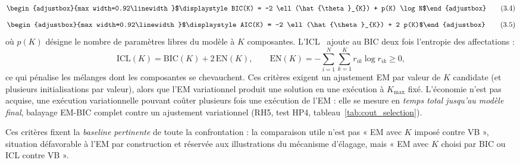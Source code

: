 \begin{equation}
\begin{adjustbox}{max width=0.92\linewidth}$\displaystyle BIC(K) = -2 \ell (\hat{\theta }_{K}) + p(K) \log N$\end{adjustbox}
\tag{3.4}
\label{eq:2_4}
\end{equation}
\begin{equation}
\begin{adjustbox}{max width=0.92\linewidth}$\displaystyle AIC(K) = -2 \ell (\hat{\theta }_{K}) + 2 p(K)$\end{adjustbox}
\tag{3.5}
\label{eq:2_5}
\end{equation}
où $p(K)$ désigne le nombre de paramètres libres du modèle à $K$ composantes. L'ICL~\cite{biernacki2000} ajoute au BIC deux fois l'entropie des affectations :
\begin{equation}
\mathrm{ICL}(K) = \mathrm{BIC}(K) + 2\,\mathrm{EN}(K), \qquad \mathrm{EN}(K) = -\sum_{i=1}^{N}\sum_{k=1}^{K} r_{ik}\log r_{ik} \geq 0,
\tag{3.5b}
\label{eq:2_5b}
\end{equation}
ce qui pénalise les mélanges dont les composantes se chevauchent. Ces critères exigent un ajustement EM par valeur de $K$ candidate (et plusieurs initialisations par valeur), alors que l'EM variationnel produit une solution en une exécution à $K_{\max}$ fixé. L'économie n'est pas acquise, une exécution variationnelle pouvant coûter plusieurs fois une exécution de l'EM : elle se mesure en \emph{temps total jusqu'au modèle final}, balayage EM-BIC complet contre un ajustement variationnel (RH5, test HP4, tableau~\ref{tab:cout_selection}).

Ces critères fixent la \emph{baseline pertinente} de toute la confrontation : la comparaison utile n'est pas « EM avec $K$ imposé contre VB », situation défavorable à l'EM par construction et réservée aux illustrations du mécanisme d'élagage, mais « EM avec $K$ choisi par BIC ou ICL contre VB ».

